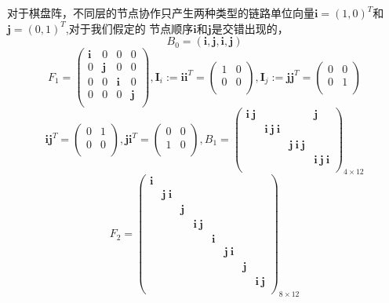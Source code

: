 \documentclass[12pt]{article}
\begin{document}
对于棋盘阵，不同层的节点协作只产生两种类型的链路单位向量$\bm{i}=(1,0)^T$和$\bm{j}=(0,1)^T$,对于我们假定的
节点顺序$\bm{i}$和$\bm{j}$是交错出现的，
\[
B_0=(\bm{i},\bm{j},\bm{i},\bm{j})
\]
\[
F_1=\left(
\begin{array}{cccc}
\bm{i} & 0 & 0 & 0 \\
0 &\bm{j}& 0 & 0 \\
0 & 0 & \bm{i} & 0\\
0 & 0 & 0 & \bm{j}\\
\end{array}
\right),
\bm{I}_i:=\bm{i}\bm{i}^T=\left(
\begin{array}{cc}
1 & 0\\
0 & 0 \\
\end{array}
\right),
\bm{I}_j:=\bm{j}\bm{j}^T=\left(
\begin{array}{cc}
0 & 0\\
0 & 1 \\
\end{array}
\right)
\]
\[
\bm{i}\bm{j}^T=\left(
\begin{array}{cc}
0 & 1\\
0 & 0 \\
\end{array}
\right),
\bm{j}\bm{i}^T=\left(
\begin{array}{cc}
0 & 0\\
1 & 0 \\
\end{array}
\right),B_1=\left(
\begin{array}{cccc}
\bm{i}\: \bm{j} &  &  & \bm{j}  \\
 &\bm{i}\: \bm{j} \: \bm{i}&  &  \\
 &  & \bm{j}\: \bm{i} \: \bm{j} & \\
 &  &  & \bm{i}\: \bm{j} \: \bm{i}\\
\end{array}
\right)_{4 \times 12}\]
\[
F_2=\left(
\begin{array}{cccccccc}
\bm{i}&&&&&&&  \\
&\bm{j} \: \bm{i}&&&&&&\\
&&\bm{j}&&&&&\\
&&&\bm{i}\: \bm{j}&&&&\\
&&&&\bm{i}&&&\\
&&&&&\bm{j} \: \bm{i}&&\\
&&&&&&\bm{j}&\\
&&&&&&&\bm{i}\: \bm{j}\\
\end{array}
\right)_{8 \times 12}
\]
\end{document}
